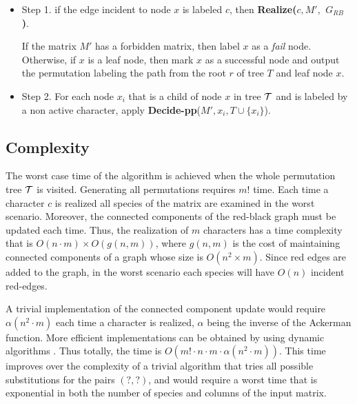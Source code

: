 \documentclass{llncs}
\newcommand{\pp}{Decide-pp}
\newcommand{\grb}{$G_{RB}$ }
\begin{document}
\begin{itemize}

\item Step 1.  if  the edge incident to node $x$ is labeled $c$, then  {\bf Realize($c, M',$ \grb )}. 

 If the matrix $M'$ has a  forbidden matrix, then label $x$ as a {\em fail} node. Otherwise, if $x$ is a leaf node, then mark $x$ as a  successful node and output the permutation labeling the path from the root $r$ of tree $T$ and leaf node $x$. 




\item Step 2. For each node $x_i $  that is a  child of node $x$ in tree $\cal T$ and is labeled by a non active character, 
apply  {\bf \pp}($M', x_i, T \cup \{x_i\}$).



\end{itemize}





\subsection{Complexity}
The worst case time  of the algorithm is achieved when  the whole permutation tree $\cal T$ is visited. Generating all permutations requires $m!$ time.
Each time a character $c$ is realized  all species of the matrix are examined in the worst scenario.   Moreover, the connected components of the red-black graph must be updated each time.
Thus, the realization of  $m$ characters has a time complexity that is $O(n \cdot m) \times O(g(n,m))$, where $g(n,m)$ is the cost of maintaining connected components of a graph whose size is $O (n^2 \times m)$.  Since red edges are added  to the graph, in the worst  scenario each species   will have $O(n)$ incident red-edges. 

A trivial implementation of the connected component update  would require $\alpha(n^2 \cdot m )$ each time a character is realized, $\alpha$  being  the inverse of the Ackerman function. More efficient  implementations can be obtained  by  using dynamic algorithms \cite{Holm}.   Thus  totally,  the time is $O(m! \cdot n \cdot m \cdot \alpha(n^2 \cdot m))$.
This time improves over the complexity of a trivial   algorithm that  tries all possible substitutions for the pairs $(?,?)$, and would require a worst time that is   exponential in both the number of species and columns of the input matrix.
\end{document}
